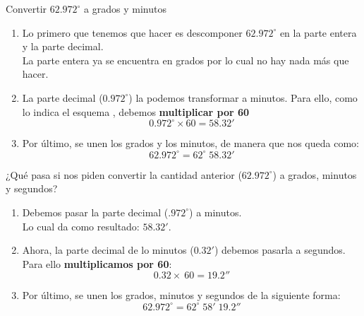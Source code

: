 \begin{example}
	Convertir $\pmb{62.972^\circ}$ a grados y minutos
	\begin{enumerate}
		\item Lo primero que tenemos que hacer es descomponer $62.972^\circ$ en la 
		parte entera y la parte decimal. \\
		La parte entera ya se encuentra en grados por lo cual no hay nada más que 
		hacer.

		\item La parte decimal ($0.972^\circ$) la podemos transformar a minutos.
		Para ello, como lo indica el esquema , debemos 
		\textbf{multiplicar por 60}
		\begin{equation*}
			0.972^\circ \times 60 = 58.32' 
		\end{equation*}

		\item Por último, se unen los grados y los minutos, de manera que nos queda 
		como: 
		\begin{equation*}
			\boxed{\pmb{62.972^\circ} = 62^\circ\; 58.32'}
		\end{equation*}
	\end{enumerate}
\end{example}

\begin{example}
	¿Qué pasa si nos piden convertir la cantidad anterior ($\pmb{62.972^\circ}$) a
	grados, minutos y segundos?
	\begin{enumerate}
		\item Debemos pasar la parte decimal ($.972^\circ$) a minutos.\\
		Lo cual da como resultado: $58.32'$.

		\item Ahora, la parte decimal de lo minutos ($0.32'$) debemos pasarla a 
		segundos. Para ello \textbf{multiplicamos por 60}:
		\begin{equation*}
			0.32 \times\ 60 = 19.2''
		\end{equation*}

		\item Por último, se unen los grados, minutos y segundos de la siguiente 
		forma:
		\begin{equation*}
			\boxed{\pmb{62.972^\circ} = 62^\circ\; 58'\; 19.2''}
		\end{equation*}
	\end{enumerate}
\end{example}

